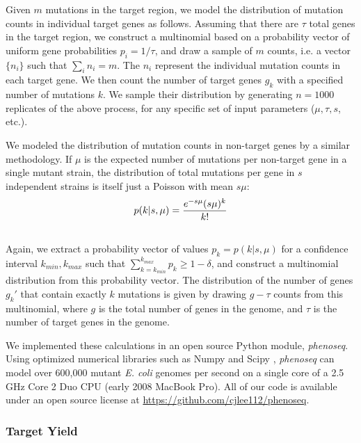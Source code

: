 \documentclass[letterpaper,10pt,english]{howto}
\begin{document}
Given $m$ mutations in the target region, we model the distribution
of mutation counts in individual target genes as follows.  Assuming
that there are $\tau$ total genes in the target region,
we construct a multinomial based on a probability vector of
uniform gene probabilities $p_i = 1/\tau$, and draw a sample
of $m$ counts, i.e. a vector $\{n_i\}$ such that
$\sum_i{n_i}=m$.  The $n_i$ represent the individual
mutation counts in each target gene.
We then count the number of target genes $g_k$
with a specified number of mutations $k$.
We sample their distribution
by generating $n=1000$ replicates of the above process,
for any specific set of input parameters ($\mu, \tau, s$, etc.).

We modeled the distribution of mutation counts in non-target genes by
a similar methodology.  If $\mu$ is the expected number of
mutations per non-target gene in a single mutant strain, the
distribution of total mutations per gene in $s$ independent
strains is itself just a Poisson with mean $s\mu$:
\begin{gather}
\begin{split}p(k|s, \mu) = \frac{e^{-s\mu}(s\mu)^k}{k!}\end{split}\notag\\\begin{split}\end{split}\notag
\end{gather}
Again, we extract a probability vector of values
$p_k = p(k|s,\mu)$
for a confidence interval $k_{min},k_{max}$ such that
$\sum_{k=k_{min}}^{k_{max}}{p_k} \ge 1-\delta$,
and construct a multinomial distribution from this probability
vector.  The distribution of the number of genes $g_k'$ that
contain exactly $k$ mutations is given by drawing $g-\tau$
counts from this multinomial, where $g$ is the total number
of genes in the genome, and $\tau$ is the number of target
genes in the genome.

We implemented these calculations in an open source Python module,
\emph{phenoseq}.  Using optimized numerical libraries such as Numpy
and Scipy \cite{Scipy2001} , \emph{phenoseq} can model over
600,000 mutant \emph{E. coli} genomes per second on a single core
of a 2.5 GHz Core 2 Duo CPU (early 2008 MacBook Pro).
All of our code is available under an open source license
at \href{https://github.com/cjlee112/phenoseq}{https://github.com/cjlee112/phenoseq}.


\subsubsection{Target Yield}
\end{document}
